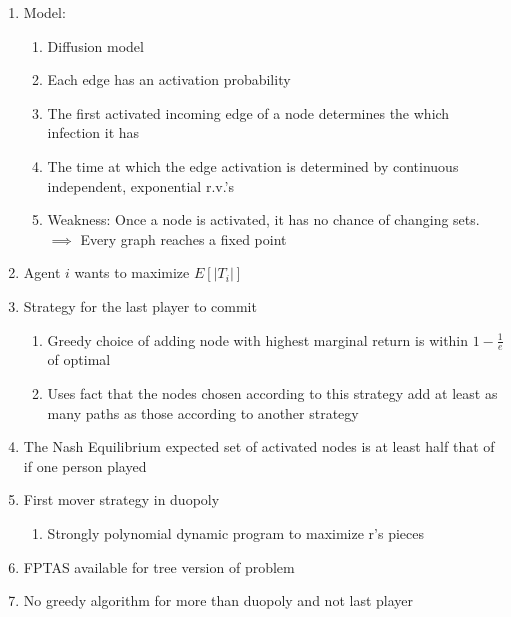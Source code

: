 \documentclass[11pt]{article}
\begin{document}
\begin{enumerate}
    \item Model:
    \begin{enumerate}
        \item Diffusion model
        
        \item Each edge has an activation probability
        
        \item The first activated incoming edge of a node determines the which infection it has
        
        \item The time at which the edge activation is determined by continuous independent, exponential r.v.'s
        
        \item Weakness: Once a node is activated, it has no chance of changing sets.$\implies$ Every graph reaches a fixed point
    \end{enumerate}
    \item Agent $i$ wants to maximize $E[|T_{i}|]$
    \item Strategy for the last player to commit
    \begin{enumerate}
    
        \item Greedy choice of adding node with highest 
        marginal return is within $1-\frac{1}{e}$ of optimal
        
        \item Uses fact that the nodes chosen according to this strategy add at least as many paths as those according to another strategy
        
    \end{enumerate}
    
    \item The Nash Equilibrium expected set of activated nodes is at least half that of if one person played
    
    \item First mover strategy in duopoly
    \begin{enumerate}
        \item Strongly polynomial dynamic program to maximize r's pieces
    \end{enumerate}
    
    \item FPTAS available for tree version of problem
    
    \item No greedy algorithm for more than duopoly and not last player
    

\end{enumerate}
\end{document}
